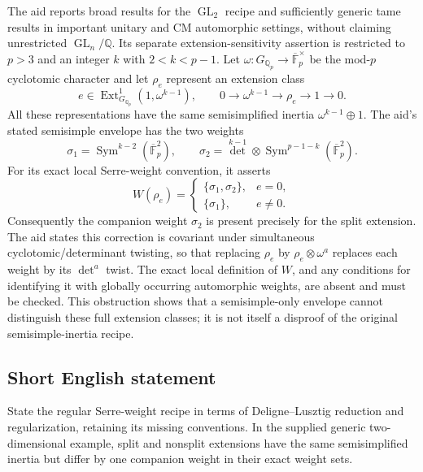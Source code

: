 \documentclass[11pt]{article}
\newcommand{\Q}{\mathbb{Q}}
\newcommand{\F}{\mathbb{F}}
\begin{document}
The aid reports broad results for the $\operatorname{GL}_2$ recipe and sufficiently generic tame results in important unitary and CM automorphic settings, without claiming unrestricted $\operatorname{GL}_n/\Q$. Its separate extension-sensitivity assertion is restricted to $p>3$ and an integer $k$ with $2<k<p-1$. Let $\omega:G_{\Q_p}\to\overline{\F}_p^\times$ be the mod-$p$ cyclotomic character and let $\rho_e$ represent an extension class
\[
e\in\operatorname{Ext}^1_{G_{\Q_p}}(1,\omega^{k-1}),\qquad
0\longrightarrow\omega^{k-1}\longrightarrow\rho_e\longrightarrow1\longrightarrow0.
\]
All these representations have the same semisimplified inertia $\omega^{k-1}\oplus1$. The aid's stated semisimple envelope has the two weights
\[
\sigma_1=\operatorname{Sym}^{k-2}(\overline{\F}_p^2),\qquad
\sigma_2=\det^{k-1}\otimes\operatorname{Sym}^{p-1-k}(\overline{\F}_p^2).
\]
For its exact local Serre-weight convention, it asserts
\[
W(\rho_e)=
\begin{cases}
\{\sigma_1,\sigma_2\},&e=0,\\
\{\sigma_1\},&e\ne0.
\end{cases}
\]
Consequently the companion weight $\sigma_2$ is present precisely for the split extension. The aid states this correction is covariant under simultaneous cyclotomic/determinant twisting, so that replacing $\rho_e$ by $\rho_e\otimes\omega^a$ replaces each weight by its $\det^a$ twist. The exact local definition of $W$, and any conditions for identifying it with globally occurring automorphic weights, are absent and must be checked. This obstruction shows that a semisimple-only envelope cannot distinguish these full extension classes; it is not itself a disproof of the original semisimple-inertia recipe.
\subsection{Short English statement}
State the regular Serre-weight recipe in terms of Deligne--Lusztig reduction and regularization, retaining its missing conventions. In the supplied generic two-dimensional example, split and nonsplit extensions have the same semisimplified inertia but differ by one companion weight in their exact weight sets.
\end{document}
